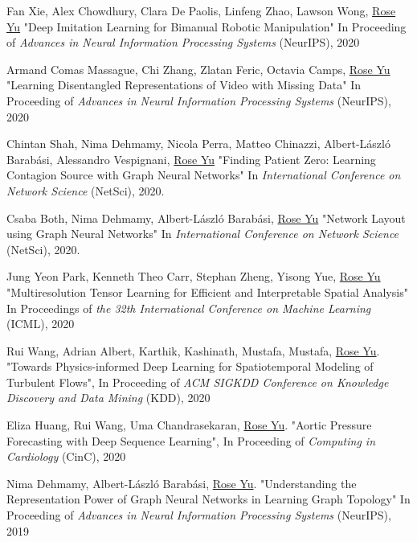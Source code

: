 \documentclass[margin,line]{res}
\begin{document}
\begin{resume}
\begin{enumerate}[label={[C\arabic*]}]
\item Fan Xie,  Alex  Chowdhury, Clara De Paolis, Linfeng Zhao, Lawson Wong,  \underline{Rose Yu}
"Deep Imitation Learning for Bimanual  Robotic Manipulation"
  In Proceeding of \textit{Advances in Neural Information Processing Systems} (NeurIPS), 2020
  
\item Armand Comas Massague, Chi Zhang, Zlatan Feric, Octavia Camps,  \underline{Rose Yu}
"Learning Disentangled Representations of Video with Missing Data"
  In  Proceeding of \textit{Advances in Neural Information Processing Systems} (NeurIPS), 2020
 
 
\item Chintan Shah, Nima Dehmamy, Nicola Perra, Matteo Chinazzi, Albert-László Barabási, Alessandro Vespignani, \underline{Rose Yu}
"Finding Patient Zero: Learning Contagion Source with Graph Neural Networks"
 In \textit{International Conference on Network Science} (NetSci),  2020. 
     
 \item Csaba Both, Nima Dehmamy,  Albert-László Barabási, \underline{Rose Yu}
"Network Layout using Graph Neural Networks"
 In \textit{International Conference on Network Science} (NetSci),  2020.  
      
\item Jung Yeon Park, Kenneth Theo Carr, Stephan Zheng, Yisong Yue, \underline{Rose Yu}
"Multiresolution Tensor Learning for Efficient and Interpretable Spatial Analysis"
 In Proceedings  of  \textit{the 32th International Conference on Machine Learning} (ICML), 2020

\item Rui Wang, Adrian Albert,  Karthik, Kashinath, Mustafa, Mustafa,  \underline{Rose Yu}. "Towards Physics-informed Deep Learning for Spatiotemporal Modeling of Turbulent Flows", In  Proceeding of\textit{ ACM SIGKDD Conference on Knowledge Discovery and Data Mining} (KDD), 2020

\item Eliza Huang, Rui Wang, Uma Chandrasekaran, \underline{Rose Yu}.  "Aortic Pressure Forecasting with Deep Sequence Learning", In  Proceeding of  \textit{Computing in Cardiology} (CinC), 2020 

\item Nima Dehmamy, Albert-L\'aszl\'o Barab\'asi, \underline{Rose Yu}.  "Understanding the Representation Power of Graph Neural Networks in Learning Graph Topology" In Proceeding of  \textit{Advances in Neural Information Processing Systems} (NeurIPS), 2019
 

\end{enumerate}
\end{resume}
\end{document}
